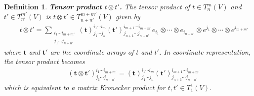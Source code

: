 \documentclass[11pt,fleqn]{article}
\newcommand{\cd}{\ensuremath{\cdots}}
\newcommand{\bmit}[1]{{\bfseries\itshape\mathversion{bold}#1}}
\newcommand{\bo}[1]{\ensuremath{\mathbf{#1}}}
\newcommand{\miniar}[1]{\ensuremath{\begin{smallmatrix}#1\end{smallmatrix}}}
\theoremstyle{mystyle}
\newtheorem{dfn}{Definition}
\numberwithin{equation}{section}
\begin{document}
\begin{dfn}
\bmit{Tensor product $t\otimes t'$.}
The \textit{tensor product} of $t\in T_n^m(V)$ and $t'\in T_{n'}^{m'}(V)$ is $t\otimes t'\in T_{n+n'}^{m+m'}(V)$ given by
\begin{align*}
&&
  t\otimes t'
=
  \sum_{\miniar{i_1\cd i_{m+m'}\\j_1\cd j_{n+n'}}}
  (\bo{t})_{j_1\cd j_n}^{i_1\cd i_m}
  (\bo{t}')_{j_{n+1}\cd j_{n+n'}}^{i_{m+1}\cd i_{m+m'}}
  e_{i_1}\otimes\cd\otimes e_{i_{n+n'}}\otimes
  e^{j_1}\otimes\cd\otimes e^{j_{m+m'}}
\end{align*}
where $\bo{t}$ and $\bo{t}'$ are the coordinate arrays of $t$ and $t'$.
In coordinate representation, the tensor product becomes
\begin{align*}
&&
  (\bo{t}\otimes\bo{t}')^{i_1\cd i_{m+m'}}_{j_1\cd j_{n+n'}}
=
  (\bo{t})_{j_1\cd j_n}^{i_1\cd i_m}
  (\bo{t}')_{j_{n+1}\cd j_{n+n'}}^{i_{m+1}\cd i_{m+m'}}
\end{align*}
which is equivalent to a \textit{matrix Kronecker product} for $t,t'\in T_1^1(V)$.
\end{dfn}
\end{document}
